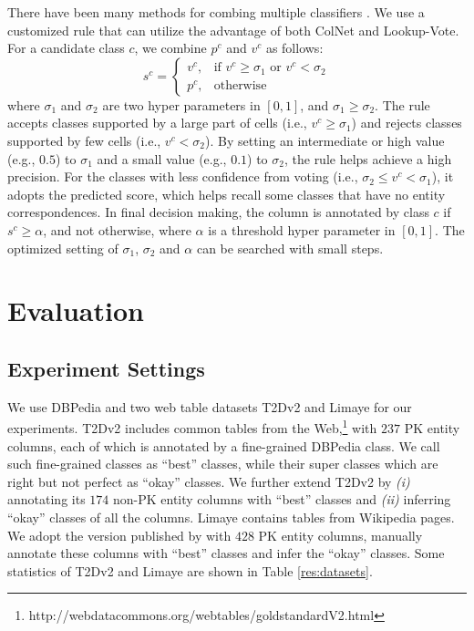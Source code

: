 \documentclass[letterpaper]{article}
\newcommand{\rv}[1]{{\color{black}#1}}
\newcommand{\camera}[1]{{\color{black}#1}}
\newcommand{\ColNet}{\textsf{ColNet}\xspace}
\begin{document}
\rv{There have been many methods for combing multiple classifiers \cite{ponti2011combining}.
We use a customized rule that can utilize the advantage of both \ColNet and Lookup-Vote.}
For a candidate class $c$, we combine $p^c$ and $v^c$ as follows: 
\begin{equation}
s^c = 
\begin{cases} 
v^c,  & \mbox{if }v^c \geq \sigma_1 \mbox{ or } v^c < \sigma_2 \\
p^c, & \mbox{otherwise }
\end{cases}
\end{equation}
where $\sigma_1$ and $\sigma_2$ are two hyper parameters in $\left[ 0,1 \right]$,
\rv{and $\sigma_1 \geq \sigma_2$.
The rule accepts classes supported by a large part of cells (i.e., $v^c \geq \sigma_1$) 
and rejects classes supported by few cells (i.e., $v^c < \sigma_2$).
By setting an intermediate or high value (e.g., $0.5$) to $\sigma_1$ and a small value (e.g., $0.1$) to $\sigma_2$, the rule helps achieve a high precision.
For the classes with less confidence from voting (i.e., $\sigma_2 \le v^c < \sigma_1$), 
it adopts the predicted score,
which helps recall some classes that have no entity correspondences.
}
In final decision making,
the column is annotated by class $c$ if $s^c \ge \alpha$,
and not otherwise, 
where $\alpha$ is a threshold hyper parameter in $\left[0, 1\right]$.
\rv{The optimized setting of $\sigma_1$, $\sigma_2$ and $\alpha$ can be searched with small steps.}






\section{Evaluation}

\subsection{Experiment Settings}

We use DBPedia \cite{auer2007dbpedia} and two web table \camera{datasets} T2Dv2 and Limaye for our experiments.
T2Dv2
includes common tables from the Web,\footnote{http://webdatacommons.org/webtables/goldstandardV2.html} 
with $237$ \rv{PK} entity columns,
each of which is annotated by a fine-grained DBPedia class. 
We call such fine-grained classes as ``best'' classes,  
while their super classes which are right but not perfect as ``okay'' classes.
We further extend T2Dv2 by \textit{(i)} annotating its $174$ non-PK entity columns with ``best'' classes
and \textit{(ii)} inferring ``okay'' classes of all the columns. 
Limaye 
contains tables from Wikipedia pages.
We adopt the version published by \cite{efthymiou2017matching} with $428$ PK entity columns, 
manually annotate these columns with ``best'' classes
and infer the ``okay'' classes.
Some statistics of T2Dv2 and Limaye are shown in Table \ref{res:datasets}.
\end{document}
